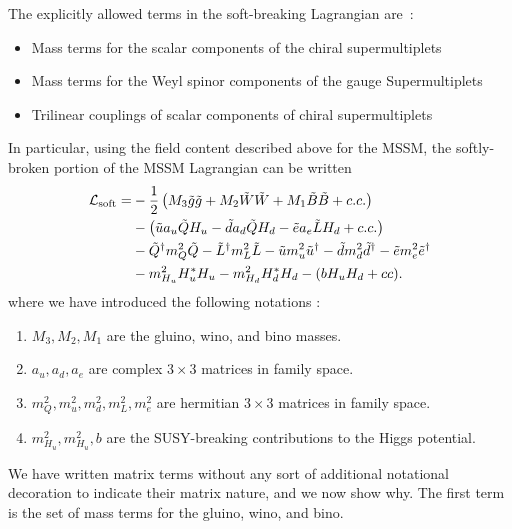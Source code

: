 The explicitly allowed terms in the soft-breaking Lagrangian are~\cite{archilSUSYLectures}:
\begin{itemize}
\item Mass terms for the scalar components of the chiral supermultiplets
\item Mass terms for the Weyl spinor components of the gauge Supermultiplets
\item Trilinear couplings of scalar components of chiral supermultiplets
\end{itemize}
In particular, using the field content described above for the MSSM, the softly-broken portion of the MSSM Lagrangian can be written
\begin{align}
\mathcal{L}_{\text{soft}} = &-\frac{1}{2}\begin{pmatrix} M_3 \tilde{g} \tilde{g} + M_2 \tilde{W} \tilde{W} + M_1 \tilde{B} \tilde{B} + c.c. \end{pmatrix} \\
                    &-\begin{pmatrix} \tilde{u} a_u \tilde{Q} H_u - \tilde{d} a_d \tilde{Q} H_d - \tilde{e} a_e \tilde{L} H_d + c.c. \end{pmatrix} \\
                    &- \tilde{Q}^\dagger m_Q^2 \tilde{Q} - \tilde{L}^\dagger m_L^2 \tilde{L} - \tilde{u} m_u^2 \tilde{u}^\dagger - \tilde{d} m_d^2 \tilde{d}^\dagger - \tilde{e} m_e^2 \tilde{e}^\dagger \\
                    &- m^2_{H_u} H_u^* H_u - m^2_{H_d} H_d^* H_d - (b H_u H_d + cc).
\end{align}
where we have introduced the following notations :
\begin{enumerate}
\item $M_3,M_2,M_1$ are the gluino, wino, and bino masses. \label{list:gaugino_masses}
\item $a_u,a_d,a_e$  are complex $3 \times 3$ matrices in family space. \label{list:yukawa_couplings}
\item $m_Q^2 , m_u^2, m_d^2, m_L^2,m_e^2 $ are hermitian  $3 \times 3$ matrices in family space. \label{list:flavor_changing}
\item $m_{H_u}^2, m_{H_u}^2, b$ are the SUSY-breaking contributions to the Higgs potential. \label{list:higgs}
\end{enumerate}
We have written matrix terms without any sort of additional notational decoration to indicate their matrix nature, and we now show why.
The first term  is the set of mass terms for the gluino, wino, and bino.
